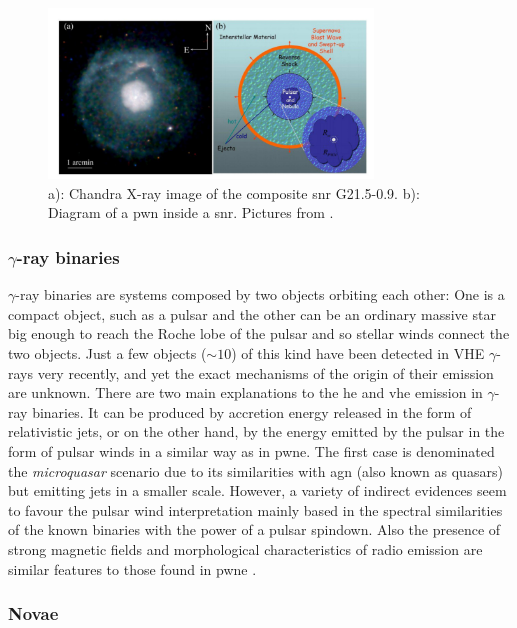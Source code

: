 \documentclass[main.tex]{subfiles}
\begin{document}
\begin{figure}
\centering
 \includegraphics[width=0.77\textwidth]{Pictures/compositesnr.pdf}
  \caption{a): Chandra X-ray image of the composite \gls{snr} G21.5-0.9. b): Diagram of a \gls{pwn} inside a \gls{snr}. Pictures from \cite{2015SNRingammarays}.}
    \label{fig:compositesnr}
\end{figure}


\subsubsection{$\gamma$-ray binaries}

$\gamma$-ray binaries are systems composed by two objects orbiting each other: One is a compact object, such as a pulsar and the other can be an ordinary massive star big enough to reach the Roche lobe of the pulsar and so stellar winds connect the two objects. Just a few objects ($\sim 10$) of this kind have been detected in VHE $\gamma$-rays very recently, and yet the exact mechanisms of the origin of their emission are unknown.
There are two main explanations to the \gls{he} and \gls{vhe} emission in $\gamma$-ray binaries. It can be produced by accretion energy released in the form of relativistic jets, or on the other hand, by the energy emitted by the pulsar in the form of pulsar winds in a similar way as in \gls{pwne}. The first case is denominated the \textit{microquasar} scenario due to its similarities with \gls{agn} (also known as quasars) but emitting jets in a smaller scale. However, a variety of indirect evidences seem to favour the pulsar wind interpretation mainly based in the spectral similarities of the known binaries with the power of a pulsar spindown. Also the presence of strong magnetic fields and morphological characteristics of radio emission are similar features to those found in \gls{pwne} \cite{2013binaries}. 

\subsubsection{Novae}
\end{document}
